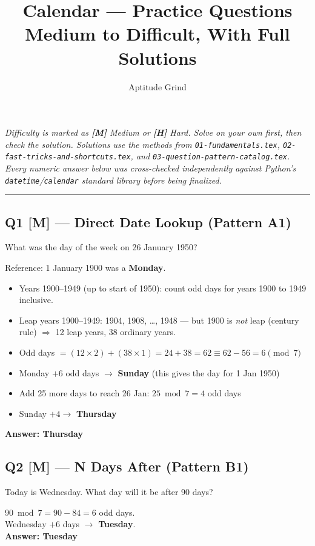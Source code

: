 \documentclass[11pt]{article}
\title{\color{primary}\textbf{Calendar --- Practice Questions}\\[4pt]\large Medium to Difficult, With Full Solutions}
\author{Aptitude Grind}
\date{}
\begin{document}
\maketitle
\thispagestyle{fancy}

\noindent\textit{Difficulty is marked as \textbf{[M]} Medium or \textbf{[H]} Hard. Solve on your own
first, then check the solution. Solutions use the methods from \texttt{01-fundamentals.tex},
\texttt{02-fast-tricks-and-shortcuts.tex}, and \texttt{03-question-pattern-catalog.tex}. Every
numeric answer below was cross-checked independently against Python's \texttt{datetime}/\texttt{calendar}
standard library before being finalized.}

\bigskip
\hrule
\bigskip

\subsection*{Q1 [M] --- Direct Date Lookup (Pattern A1)}
What was the day of the week on 26 January 1950?

\begin{tipbox}[Solution]
Reference: 1 January 1900 was a \textbf{Monday}.
\begin{itemize}[leftmargin=1.4em]
  \item Years 1900--1949 (up to start of 1950): count odd days for years 1900 to 1949 inclusive.
  \item Leap years 1900--1949: 1904, 1908, \ldots, 1948 --- but 1900 is \emph{not} leap (century rule)
    $\Rightarrow$ 12 leap years, 38 ordinary years.
  \item Odd days $= (12 \times 2) + (38 \times 1) = 24 + 38 = 62 \equiv 62 - 56 = 6 \pmod 7$
  \item Monday $+ 6$ odd days $\to$ \textbf{Sunday} (this gives the day for 1 Jan 1950)
  \item Add 25 more days to reach 26 Jan: $25 \bmod 7 = 4$ odd days
  \item Sunday $+ 4 \to$ \textbf{Thursday}
\end{itemize}
\textbf{Answer: Thursday}
\end{tipbox}

\subsection*{Q2 [M] --- N Days After (Pattern B1)}
Today is Wednesday. What day will it be after 90 days?

\begin{tipbox}[Solution]
$90 \bmod 7 = 90 - 84 = 6$ odd days. \\
Wednesday $+ 6$ days $\to$ \textbf{Tuesday}.\\
\textbf{Answer: Tuesday}
\end{tipbox}
\end{document}
